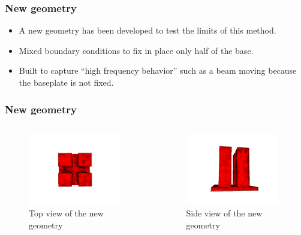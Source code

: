 \documentclass{beamer}
\begin{document}
\begin{frame}
\frametitle{New geometry}
\begin{itemize}
    \item A new geometry has been developed to test the limits of this method. 
    \item Mixed boundary conditions to fix in place only half of the base.
    \item Built to capture ``high frequency behavior'' such as a beam moving because the baseplate is not fixed.
\end{itemize}
\end{frame}

\begin{frame}
\frametitle{New geometry}
\begin{columns}
    \begin{figure}
        \centering
        \includegraphics[width=0.95\textwidth]{Images/complex_domain_topview.png}
        \caption{Top view of the new geometry}
    \end{figure}
    \begin{figure}
        \centering
        \includegraphics[width=0.95\textwidth]{Images/complex_domain_side.png}
        \caption{Side view of the new geometry}
    \end{figure}
\end{columns}
\end{frame}
\end{document}
